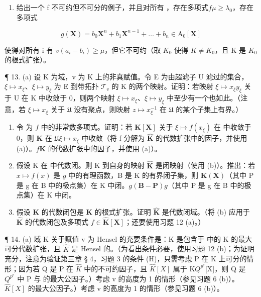 \begin{enumerate}
\def\labelenumi{(\alph{enumi})}
\setcounter{enumi}{3}
\tightlist
\item
  给出一个 f 不可约但不可分的例子，并且对所有 ，存在多项式\(f\)\(\mu \geqslant \lambda_0\)，存在多项式
\end{enumerate}

\[
g (\mathbf {X}) = b _ {0} \mathbf {X} ^ {n} + b _ {1} \mathbf {X} ^ {n - 1} + \dots + b _ {n} \in \mathrm{A} _ {0} [ \mathbf {X} ]
\]

使得对所有 i 有 \(v(a_{i} - b_{i}) \geqslant \mu\)，但它不可约（取 \(K_{0}\) 使得 \(K \neq K_{0}\)，且 K 是 \(K_{0}\) 的根式扩张）。

¶ 13. (a) 设 K 为域，v 为 K 上的非真赋值。令 E 为由超滤子 U 滤过的集合，\(\xi \mapsto x_{\xi}\)、\(\xi \mapsto y_{\xi}\) 为 E 到带拓扑 \(\mathcal{T}_{v}\) 的 K 的两个映射。证明：若映射 \(\xi \mapsto x_{\xi}y_{\xi}\) 关于 U 在 K 中收敛于 0，则两个映射 \(\xi \mapsto x_{\xi}\)、\(\xi \mapsto y_{\xi}\) 中至少有一个也如此。（注意，若 \(\xi \mapsto x_{\xi}\) 关于 \(\mathfrak{U}\) 没有聚点，则映射 \(z \mapsto x_{\xi}^{-1}\) 在 \(\mathfrak{U}\) 的某个子集上有界。）

\begin{enumerate}
\def\labelenumi{(\alph{enumi})}
\setcounter{enumi}{1}
\item
  令  为 \(f\) 中的非常数多项式。证明：若 \(\mathbf{K}[\mathbf{X}]\) 关于 \(\xi \mapsto f(x_{\xi})\) 在  中收敛于 0，则 \(\mathbf{K}\) 在 \(\mathfrak{U}\)\(\xi \mapsto x_{\xi}\) 中收敛（将 f 分解为 \(\hat{\mathbf{K}}\) 的代数扩张中的因子，并使用 (a)）。\(f\)\(\mathbf{K}\) 的代数扩张中的因子，并使用 (a)）。
\item
  假设 K 在  中代数闭。则 K 到自身的映射 \(\hat{\mathbf{K}}\) 是闭映射（使用 (b)）。推出：若 \(x \mapsto f(x)\) 是 \(g\) 中的有理函数，B 是 K 的有界闭子集，则 \(\mathbf{K}(\mathbf{X})\)（其中 P 是 g 在 B 中的极点集）在 K 中闭。\(g(\mathbf{B} - \mathbf{P})\)\(g\)（其中 P 是 g 在 B 中的极点集）在 K 中闭。
\item
  假设 \(\mathbf{K}\) 的代数闭包是 \(\mathbf{K}\) 的根式扩张。证明 \(\hat{\mathbf{K}}\) 是代数闭域。（将 (b) 应用于 \(\hat{\mathbf{K}}\) 的代数闭包及多项式 \(f \in \hat{\mathbf{K}}[\mathbf{X}]\)；还要使用习题 12 (a)。）
\end{enumerate}

¶ 14. (a) 域 K 关于赋值 v 为 Hensel 的充要条件是：K 是包含于  中的 K 的最大可分代数扩张，且 \(\hat{K}\) 是 Hensel 的。（为看出条件必要，使用习题 12 (b)；为证明充分，注意为验证第三章 § 4，习题 3 的条件 (H)，只需考虑 P 在 K 上可分的情形；因为若 Q 是 P 在 \(\hat{K}\) 中的不可约因子，且 \(\hat{K}[X]\) 属于 K\(Q^{p^{e}}\){[}X{]}，则 Q 是 \(Q^{p^{e}}\) 中 P 与  的最大公因子。）考虑 v 的高度为 1 的情形（参见习题 6 (b)）。\(\hat{K}[X]\) 的最大公因子。）考虑 v 的高度为 1 的情形（参见习题 6 (b)）。

